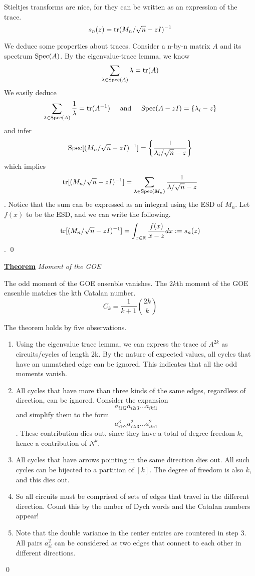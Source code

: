 \documentclass{article}
\newcommand{\new}[2]{
    \vspace{2mm}
    \noindent
    \textbf{
    \underline{#1}}
    \textit{{#2}}
    \vspace{1mm}
    \newline
}
\newcommand{\textAnd}{
    {
        \hspace{5mm}
        \textrm{and}
        \hspace{5mm}
    }
}
\begin{document}
Stieltjes transforms are nice, for they can be written as an expression 
of the trace. 
\[
    s_n(z) = \text{tr}(M_n/\sqrt{n} - zI)^{-1}
\]

\proof
We deduce some properties about traces. Consider a n-by-n matrix 
$A$ and its spectrum $\text{Spec}(A)$. By the eigenvalue-trace lemma, we know 
\[
\sum_{\lambda \in \text{Spec}(A)} \lambda = \text{tr}(A)
\]
We easily deduce 
\[
\sum_{\lambda \in \Sp(A)} \frac 1 \lambda = \tr(A^{-1})
\textAnd 
\Sp(A - z I) = \{\lambda_i - z\}
\]
and infer 
\[
    \text{Spec}[(M_n/\sqrt{n} - zI)^{-1}] = 
    \left\{
        \frac 1 {\lambda_i / \sqrt{n} - z}
    \right\}
\]
which implies 
\[
    \text{tr}[(M_n/\sqrt{n} - zI)^{-1}] = \sum_{\lambda \in \text{Spec}(M_n)}\frac 1 {\lambda / \sqrt{n} - z}
\]. 
Notice that the sum can be expressed as an integral using the ESD of 
$M_n$. Let $f(x)$ to be the ESD, and we can write the following. 
\[
    \text{tr}[(M_n/\sqrt{n} - zI)^{-1}] = 
    \int_{x \in \mathbb{R}}\frac {f(x)} {x - z}dx := s_n(z)
\]. 
\hfill \qed

\newpage

\new{Theorem} {Moment of the GOE}
The odd moment of the GOE ensenble vanishes. The $2k$th moment 
of the GOE ensenble matches the kth Catalan number. 
\[
    C_k = \frac 1 {k + 1} \binom {2k} k
    \]

\proof 


The theorem holds by five observations. 
\begin{enumerate}
    \item Using the eigenvalue trace lemma, we can express 
    the trace of $A^{2k}$ as circuits/cycles of length 2k. 
    By the nature of expected values, all cycles that have 
    an unmatched edge can be ignored. This indicates that 
    all the odd moments vanish. 
    \item All cycles that have more than three kinds of the 
    same edges, regardless of direction, can be ignored. 
    Consider the expansion
    \[
        a_{i1i2}a_{i2i3} \dots a_{iki1}
    \]
    and simplify them to the form 
    \[
        a_{i1i2}^3a_{i2i3}^2 \dots a_{iki1}^2
    \]
    . These contribution dies out, since they have a total 
    of degree freedom $k$, hence a contribution of $N^{k}$. 
    \item All cycles that have arrows pointing in the same direction 
    dies out. All such cycles can be bijected to a partition of 
    $[k]$. The degree of freedom is also $k$, and this dies out. 
    \item So all circuits must be comprised of sets of edges 
    that travel in the different direction. Count this by the 
    nmber of Dych words and the Catalan numbers appear!
    \item Note that the double variance in the center entries 
    are countered in step 3. All pairs $a_{ii}^2$ can be 
    considered as two edges that connect to each other in different directions. 
\end{enumerate}
\hfill \qed
\end{document}
